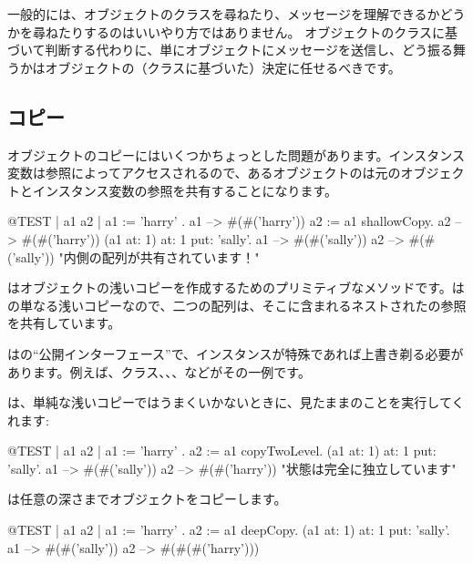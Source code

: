 \documentclass[a4paper,10pt,twoside]{book}
\begin{document}
一般的には、オブジェクトのクラスを尋ねたり、メッセージを理解できるかどうかを尋ねたりするのはいいやり方ではありません。
オブジェクトのクラスに基づいて判断する代わりに、単にオブジェクトにメッセージを送信し、どう振る舞うかはオブジェクトの（クラスに基づいた）決定に任せるべきです。

\subsection{コピー}

オブジェクトのコピーにはいくつかちょっとした問題があります。インスタンス変数は参照によってアクセスされるので、あるオブジェクトのは元のオブジェクトとインスタンス変数の参照を共有することになります。

\begin{code}{@TEST | a1 a2 |}
a1 := { { 'harry' } }.
a1 --> #(#('harry'))
a2 := a1 shallowCopy.
a2 --> #(#('harry'))
(a1 at: 1) at: 1 put: 'sally'.
a1 --> #(#('sally'))
a2 --> #(#('sally'))    "内側の配列が共有されています！"
\end{code}

はオブジェクトの浅いコピーを作成するためのプリミティブなメソッドです。はの単なる浅いコピーなので、二つの配列は、そこに含まれるネストされたの参照を共有しています。

はの``公開インターフェース''で、インスタンスが特殊であれば上書き剃る必要があります。例えば、クラス、、、などがその一例です。

は、単純な浅いコピーではうまくいかないときに、見たままのことを実行してくれます:

\begin{code}{@TEST | a1 a2 |}
a1 := { { 'harry' } } .
a2 := a1 copyTwoLevel.
(a1 at: 1) at: 1 put: 'sally'.
a1 --> #(#('sally'))
a2 --> #(#('harry'))    "状態は完全に独立しています"
\end{code}

は任意の深さまでオブジェクトをコピーします。

\begin{code}{@TEST | a1 a2 |}
a1 := { { { 'harry' } } } .
a2 := a1 deepCopy.
(a1 at: 1) at: 1 put: 'sally'.
a1 --> #(#('sally'))
a2 --> #(#(#('harry')))
\end{code}
\end{document}
